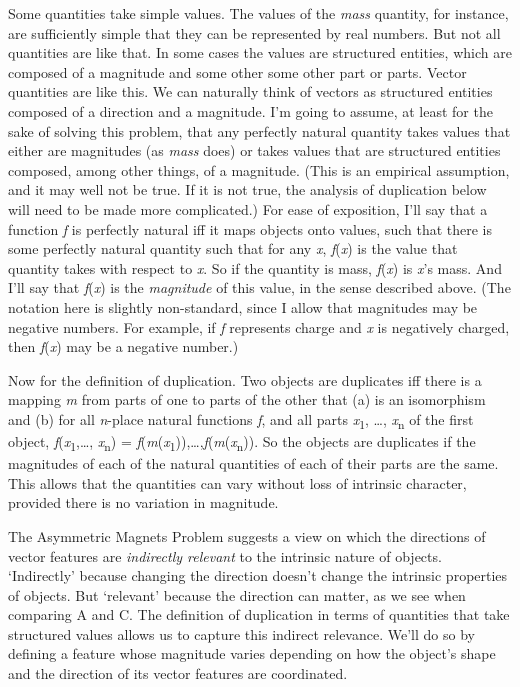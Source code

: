 \documentclass[
  10pt,
  letterpaper,
  DIV=11,
  numbers=noendperiod,
  twoside]{scrartcl}
\begin{document}
Some quantities take simple values. The values of the \emph{mass}
quantity, for instance, are sufficiently simple that they can be
represented by real numbers. But not all quantities are like that. In
some cases the values are structured entities, which are composed of a
magnitude and some other some other part or parts. Vector quantities are
like this. We can naturally think of vectors as structured entities
composed of a direction and a magnitude. I'm going to assume, at least
for the sake of solving this problem, that any perfectly natural
quantity takes values that either are magnitudes (as \emph{mass} does)
or takes values that are structured entities composed, among other
things, of a magnitude. (This is an empirical assumption, and it may
well not be true. If it is not true, the analysis of duplication below
will need to be made more complicated.) For ease of exposition, I'll say
that a function \emph{f} is perfectly natural iff it maps objects onto
values, such that there is some perfectly natural quantity such that for
any \emph{x}, \emph{f}(\emph{x}) is the value that quantity takes with
respect to \emph{x}. So if the quantity is mass, \emph{f}(\emph{x}) is
\emph{x}'s mass. And I'll say that
\textbar{}\emph{f}(\emph{x})\textbar{} is the \emph{magnitude} of this
value, in the sense described above. (The notation here is slightly
non-standard, since I allow that magnitudes may be negative numbers. For
example, if \emph{f} represents charge and \emph{x} is negatively
charged, then \textbar{}\emph{f}(\emph{x})\textbar{} may be a negative
number.)

Now for the definition of duplication. Two objects are duplicates iff
there is a mapping \emph{m} from parts of one to parts of the other that
(a) is an isomorphism and (b) for all \emph{n}-place natural functions
\emph{f}, and all parts \emph{x}\textsubscript{1}, \ldots,
\emph{x}\textsubscript{n} of the first object,
\textbar{}\emph{f}(\emph{x}\textsubscript{1},\ldots,
\emph{x}\textsubscript{n})\textbar{} =
\textbar{}\emph{f}(\emph{m}(\emph{x}\textsubscript{1})),\ldots,\emph{f}(\emph{m}(\emph{x}\textsubscript{n}))\textbar.
So the objects are duplicates if the magnitudes of each of the natural
quantities of each of their parts are the same. This allows that the
quantities can vary without loss of intrinsic character, provided there
is no variation in magnitude.

The Asymmetric Magnets Problem suggests a view on which the directions
of vector features are \emph{indirectly relevant} to the intrinsic
nature of objects. `Indirectly' because changing the direction doesn't
change the intrinsic properties of objects. But `relevant' because the
direction can matter, as we see when comparing A and C. The definition
of duplication in terms of quantities that take structured values allows
us to capture this indirect relevance. We'll do so by defining a feature
whose magnitude varies depending on how the object's shape and the
direction of its vector features are coordinated.
\end{document}
